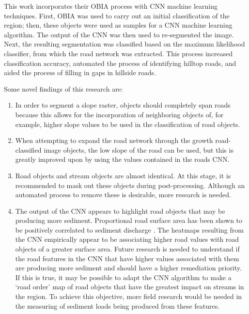 \documentclass[remotesensing,article,accept,pdftex,moreauthors]{Definitions/mdpi}
\begin{document}
This work incorporates their OBIA process with CNN machine learning techniques. First, OBIA was used to carry out an initial classification of the region; then, these objects were used as samples for a CNN machine learning algorithm. The output of the CNN was then used to re-segmented the image. Next, the resulting segmentation was classified based on the maximum likelihood classifier, from which the road network was extracted. This process increased classification accuracy, automated the process of identifying hilltop roads, and aided the process of filling in gaps in hillside roads.

Some novel findings of this research are:
\begin{enumerate}[]
\item In order to segment a slope raster, objects should completely span roads because this allows for the incorporation of neighboring objects of, for example, higher slope values to be used in the classification of road objects.

\item When attempting to expand the road network through the growth road-classified image objects, the low slope of the road can be used, but this is greatly improved upon by using the values contained in the roads CNN.  

\item Road objects and stream objects are almost identical. At this stage, it is recommended to mask out these objects during post-processing. Although an automated process to remove these is desirable, more research is needed.

\item The output of the CNN appears to highlight road objects that may be producing more sediment. Proportional road surface area has been shown to be positively correlated to sediment discharge \cite{reid}. The heatmaps resulting from the CNN empirically appear to be associating higher road values with road objects of a greater surface area. Future research is needed to understand if the road features in the CNN that have higher values associated with them are producing more sediment and should have a higher remediation priority. If this is true, it may be possible to adapt the CNN algorithm to make a ‘road order’ map of road objects that have the greatest impact on streams in the region. To achieve this objective, more field research would be needed in the measuring of sediment loads being produced from these features.  
\end{enumerate}
\end{document}
